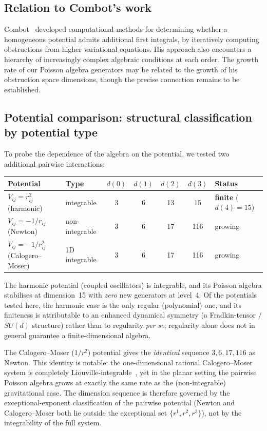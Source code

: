 \documentclass[11pt,a4paper]{article}
\theoremstyle{remark}
\begin{document}
\subsection{Relation to Combot's work}

Combot~\cite{combot-2013} developed computational methods for
determining whether a homogeneous potential admits additional
first integrals, by iteratively computing obstructions from higher
variational equations.  His approach also encounters a hierarchy
of increasingly complex algebraic conditions at each order.
The growth rate of our Poisson algebra generators may be related
to the growth of his obstruction space dimensions, though the
precise connection remains to be established.

\subsection{Potential comparison: structural classification by potential type}
\label{sec:potential-comparison}

To probe the dependence of the algebra on the potential, we
tested two additional pairwise interactions:

\begin{center}
\begin{tabular}{@{}llccccl@{}}
\toprule
Potential & Type & $d(0)$ & $d(1)$ & $d(2)$ & $d(3)$ & Status \\
\midrule
$V_{ij} = r_{ij}^2$ (harmonic) & integrable & 3 & 6 & 13 & 15 & \textbf{finite} ($d(4)=15$) \\
$V_{ij} = -1/r_{ij}$ (Newton) & non-integrable & 3 & 6 & 17 & 116 & growing \\
$V_{ij} = -1/r_{ij}^2$ (Calogero--Moser) & 1D integrable & 3 & 6 & 17 & 116 & growing \\
\bottomrule
\end{tabular}
\end{center}

The harmonic potential (coupled oscillators) is integrable, and
its Poisson algebra stabilises at dimension~15 with \emph{zero}
new generators at level~4.  Of the potentials tested here, the
harmonic case is the only regular (polynomial) one, and its
finiteness is attributable to an enhanced dynamical symmetry
(a Fradkin-tensor / $SU(d)$ structure) rather than to
regularity \emph{per se}; regularity alone does not in general
guarantee a finite-dimensional algebra.

The Calogero--Moser ($1/r^2$) potential gives the \emph{identical}
sequence $3, 6, 17, 116$ as Newton.  This identity is
notable: the one-dimensional rational Calogero--Moser system is
completely Liouville-integrable~\cite{moser-1975,calogero-1971},
yet in the planar setting the pairwise Poisson algebra grows
at exactly the same rate as the (non-integrable) gravitational
case.  The dimension sequence is therefore governed by the
exceptional-exponent classification of the pairwise potential
(Newton and Calogero--Moser both lie outside the exceptional
set $\{r^1, r^2, r^3\}$), not by the integrability of the full
system.
\end{document}
